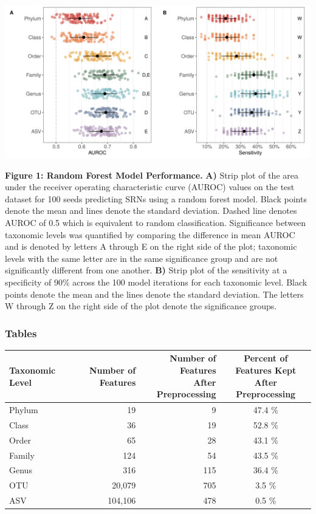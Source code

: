 \documentclass[
]{article}
\begin{document}
\includegraphics{figure_1.png}

\textbf{Figure 1: Random Forest Model Performance.} \textbf{A)} Strip
plot of the area under the receiver operating characteristic curve
(AUROC) values on the test dataset for 100 seeds predicting SRNs using a
random forest model. Black points denote the mean and lines denote the
standard deviation. Dashed line denotes AUROC of 0.5 which is equivalent
to random classification. Significance between taxonomic levels was
quantified by comparing the difference in mean AUROC and is denoted by
letters A through E on the right side of the plot; taxonomic levels with
the same letter are in the same significance group and are not
significantly different from one another. \textbf{B)} Strip plot of the
sensitivity at a specificity of 90\% across the 100 model iterations for
each taxonomic level. Black points denote the mean and the lines denote
the standard deviation. The letters W through Z on the right side of the
plot denote the significance groups.

\newpage

\hypertarget{tables}{%
\subsubsection{Tables}\label{tables}}

\begin{longtable}[]{@{}lrrc@{}}
\toprule
Taxonomic Level & Number of Features &
\makecell[c]{Number of Features \\ After Preprocessing} &
\makecell[c]{Percent of Features Kept \\ After Preprocessing} \\
\midrule
\endhead
Phylum & 19 & 9 & 47.4 \% \\
Class & 36 & 19 & 52.8 \% \\
Order & 65 & 28 & 43.1 \% \\
Family & 124 & 54 & 43.5 \% \\
Genus & 316 & 115 & 36.4 \% \\
OTU & 20,079 & 705 & 3.5 \% \\
ASV & 104,106 & 478 & 0.5 \% \\
\bottomrule
\end{longtable}
\end{document}
